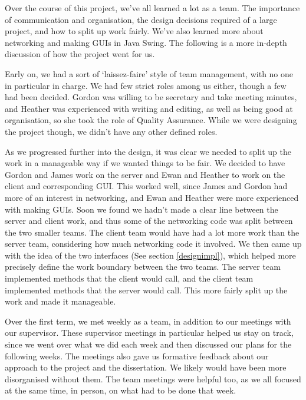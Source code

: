 
Over the course of this project, we've all learned a lot as a team. The importance of communication and organisation, the design decisions required of a large project, and how to split up work fairly. We've also learned more about networking and making GUIs in Java Swing. The following is a more in-depth discussion of how the project went for us.

Early on, we had a sort of `laissez-faire' style of team management, with no one in particular in charge. We had few strict roles among us either, though a few had been decided. Gordon was willing to be secretary and take meeting minutes, and Heather was experienced with writing and editing, as well as being good at organisation, so she took the role of Quality Assurance. While we were designing the project though, we didn't have any other defined roles.

As we progressed further into the design, it was clear we needed to split up the work in a manageable way if we wanted things to be fair. We decided to have Gordon and James work on the server and Ewan and Heather to work on the client and corresponding GUI. This worked well, since James and Gordon had more of an interest in networking, and Ewan and Heather were more experienced with making GUIs. Soon we found we hadn't made a clear line between the server and client work, and thus some of the networking code was split between the two smaller teams. The client team would have had a lot more work than the server team, considering how much networking code it involved. We then came up with the idea of the two interfaces (See section \ref{designimpl}), which helped more precisely define the work boundary between the two teams. The server team implemented methods that the client would call, and the client team implemented methods that the server would call. This more fairly split up the work and made it manageable.

Over the first term, we met weekly as a team, in addition to our meetings with our supervisor. These supervisor meetings in particular helped us stay on track, since we went over what we did each week and then discussed our plans for the following weeks. The meetings also gave us formative feedback about our approach to the project and the dissertation. We likely would have been more disorganised without them. The team meetings were helpful too, as we all focused at the same time, in person, on what had to be done that week.

